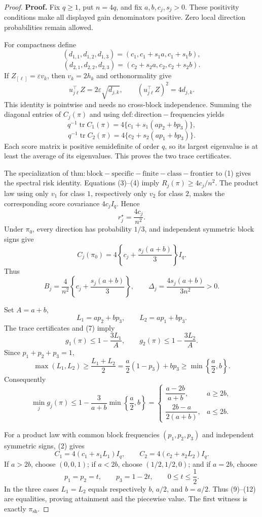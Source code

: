 \documentclass{article}
\begin{document}
\begin{proof}
\textbf{Proof.}
Fix \(q\ge1\), put \(n=4q\), and fix \(a,b,c_j,s_j>0\).  These positivity conditions make all displayed gain denominators positive.  Zero local direction probabilities remain allowed.

For compactness define
\[
(d_{1,1},d_{1,2},d_{1,3})=(c_1,c_1+s_1a,c_1+s_1b),
\]
\[
(d_{2,1},d_{2,2},d_{2,3})=(c_2+s_2a,c_2,c_2+s_2b). \tag{1}
\]
If \(Z_{[\ell]}=\varepsilon v_k\), then \(v_k=2h_k\) and orthonormality give
\[
u_{j\ell}^\top Z=2\varepsilon\sqrt{d_{j,k}},
\qquad (u_{j\ell}^\top Z)^2=4d_{j,k}. \tag{2}
\]
This identity is pointwise and needs no cross-block independence.  Summing the diagonal entries of \(C_j(\pi)\) and using \(\mathrm{def:direction-frequencies}\) yields
\[
q^{-1}\operatorname{tr}C_1(\pi)
=4\{c_1+s_1(ap_2+bp_3)\}, \tag{3}
\]
\[
q^{-1}\operatorname{tr}C_2(\pi)
=4\{c_2+s_2(ap_1+bp_3)\}. \tag{4}
\]
Each score matrix is positive semidefinite of order \(q\), so its largest eigenvalue is at least the average of its eigenvalues.  This proves the two trace certificates.

The specialization of \(\mathrm{thm:block-specific-finite-class-frontier}\) to (1) gives the spectral risk identity.  Equations (3)--(4) imply \(R_j(\pi)\ge4c_j/n^2\).  The product law using only \(v_1\) for class \(1\), respectively only \(v_2\) for class \(2\), makes the corresponding score covariance \(4c_jI_q\).  Hence
\[
r_j^\star=\frac{4c_j}{n^2}. \tag{5}
\]
Under \(\pi_0\), every direction has probability \(1/3\), and independent symmetric block signs give
\[
C_j(\pi_0)=4\left\{c_j+\frac{s_j(a+b)}3\right\}I_q. \tag{6}
\]
Thus
\[
B_j=\frac4{n^2}\left\{c_j+\frac{s_j(a+b)}3\right\},
\qquad
\Delta_j=\frac{4s_j(a+b)}{3n^2}>0. \tag{7}
\]

Set \(A=a+b\),
\[
L_1=ap_2+bp_3,
\qquad L_2=ap_1+bp_3. \tag{8}
\]
The trace certificates and (7) imply
\[
g_1(\pi)\le1-\frac{3L_1}{A},
\qquad
g_2(\pi)\le1-\frac{3L_2}{A}. \tag{9}
\]
Since \(p_1+p_2+p_3=1\),
\[
\max(L_1,L_2)
\ge\frac{L_1+L_2}{2}
=\frac a2(1-p_3)+bp_3
\ge\min\left\{\frac a2,b\right\}. \tag{10}
\]
Consequently
\[
\min_jg_j(\pi)
\le1-\frac3{a+b}\min\left\{\frac a2,b\right\}
=\begin{cases}
\dfrac{a-2b}{a+b},&a\ge2b,\\[6pt]
\dfrac{2b-a}{2(a+b)},&a\le2b.
\end{cases} \tag{11}
\]

For a product law with common block frequencies \((p_1,p_2,p_3)\) and independent symmetric signs, (2) gives
\[
C_1=4(c_1+s_1L_1)I_q,
\qquad C_2=4(c_2+s_2L_2)I_q. \tag{12}
\]
If \(a>2b\), choose \((0,0,1)\); if \(a<2b\), choose \((1/2,1/2,0)\); and if \(a=2b\), choose
\[
p_1=p_2=t,
\qquad p_3=1-2t,
\qquad 0\le t\le\frac12. \tag{13}
\]
In the three cases \(L_1=L_2\) equals respectively \(b\), \(a/2\), and \(b=a/2\).  Thus (9)--(12) are equalities, proving attainment and the piecewise value.  The first witness is exactly \(\pi_{\mathrm{sh}}\).


\end{proof}
\end{document}
